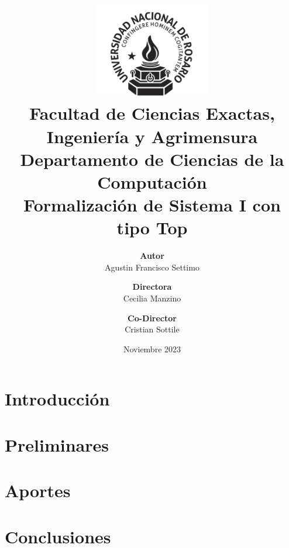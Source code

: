 \documentclass[]{report}
\title{
	\includegraphics[width=5cm]{logo.png} \\
	\vspace{0.3cm}
	\huge Facultad de Ciencias Exactas,\\ Ingeniería y Agrimensura \\
	\vspace{0.5cm}
	\Large Departamento de Ciencias de la Computación \\
	\vspace{1cm}
	\Huge \textbf{Formalización de Sistema I con tipo Top}
}
\author{
	\textbf{Autor} \\ Agustin Francisco Settimo \and
	\textbf{Directora} \\ Cecilia Manzino \and
	\textbf{Co-Director} \\ Cristian Sottile}
\date{Noviembre 2023}
\begin{document}
	
	\maketitle
	\tableofcontents
	
	\begin{abstract}
	
	\end{abstract}
	
	\chapter{Introducción}
	
	
	\chapter{Preliminares}
	
	
	\chapter{Aportes}
	
	
	\chapter{Conclusiones}
	
	
	\printbibliography
\end{document}

